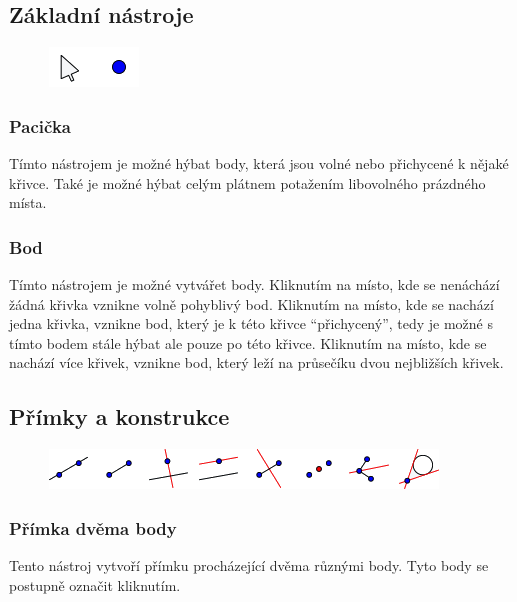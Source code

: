 \documentclass[11pt]{article}
\begin{document}
    \subsection{Základní nástroje}
    \vspace{-10pt}
    \begin{figure}[h]
        \begin{center}
        \includegraphics[scale=0.5]{imgs/basic_tools.png}
        \end{center}
    \end{figure}
    \vspace{-25pt}
    \subsubsection{Pacička}
    Tímto nástrojem je možné hýbat body, která jsou volné nebo přichycené k nějaké křivce. Také je možné hýbat celým plátnem potažením libovolného prázdného místa.
    \subsubsection{Bod} \label{point}
    Tímto nástrojem je možné vytvářet body. Kliknutím na místo, kde se nenáchází žádná křivka vznikne volně pohyblivý bod. Kliknutím na místo, kde se nachází jedna křivka, vznikne bod, který je k této křivce \enquote{přichycený}, tedy je možné s tímto bodem stále hýbat ale pouze po této křivce. Kliknutím na místo, kde se nachází více křivek, vznikne bod, který leží na průsečíku dvou nejbližších křivek.

    \subsection{Přímky a konstrukce}
    \vspace{-10pt}
    \begin{figure}[h]
        \begin{center}
        \includegraphics[scale=0.5]{imgs/line_tools.png}
        \end{center}
    \end{figure}
    \vspace{-25pt}
    \subsubsection{Přímka dvěma body}
    Tento nástroj vytvoří přímku procházející dvěma různými body. Tyto body se postupně označit kliknutím.
\end{document}
